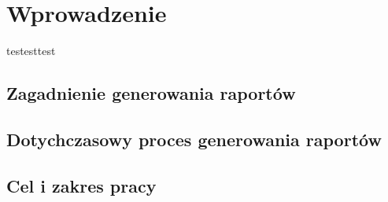 \chapter{Wprowadzenie}

testesttest

\section{ Zagadnienie generowania raportów}

\section{ Dotychczasowy proces generowania raportów}

\section{Cel i zakres pracy}

